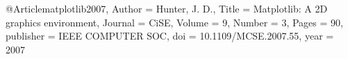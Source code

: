 
@Article{matplotlib2007,
  Author    = {Hunter, J. D.},
  Title     = {Matplotlib: A 2D graphics environment},
  Journal   = {CiSE},
  Volume    = {9},
  Number    = {3},
  Pages     = {90},
  publisher = {IEEE COMPUTER SOC},
  doi       = {10.1109/MCSE.2007.55},
  year      = 2007
}
